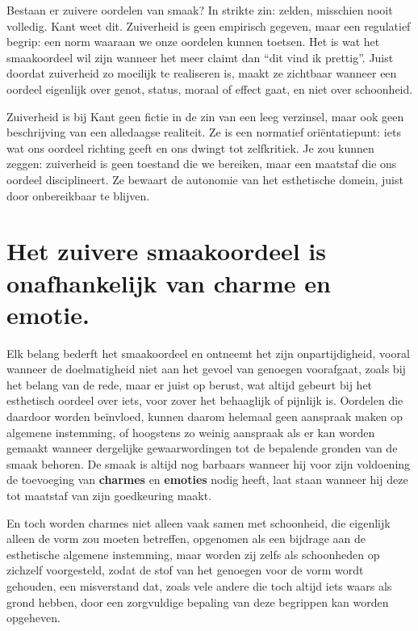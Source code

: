 \begin{mdframed}[leftmargin=0pt,rightmargin=0pt,backgroundcolor=blue!6,linecolor=white,innertopmargin=6pt,innerbottommargin=6pt]
Bestaan er zuivere oordelen van smaak? In strikte zin: zelden, misschien nooit volledig. Kant weet dit. Zuiverheid is geen empirisch gegeven, maar een regulatief begrip: een norm waaraan we onze oordelen kunnen toetsen. Het is wat het smaakoordeel wil zijn wanneer het meer claimt dan “dit vind ik prettig”.
Juist doordat zuiverheid zo moeilijk te realiseren is, maakt ze zichtbaar wanneer een oordeel eigenlijk over genot, status, moraal of effect gaat, en niet over schoonheid.

Zuiverheid is bij Kant geen fictie in de zin van een leeg verzinsel, maar ook geen beschrijving van een alledaagse realiteit. Ze is een normatief oriëntatiepunt: iets wat ons oordeel richting geeft en ons dwingt tot zelfkritiek.
Je zou kunnen zeggen: zuiverheid is geen toestand die we bereiken, maar een maatstaf die ons oordeel disciplineert. Ze bewaart de autonomie van het esthetische domein, juist door onbereikbaar te blijven.
\end{mdframed}

\section{Het zuivere smaakoordeel is onafhankelijk van charme en emotie.}

Elk belang bederft het smaakoordeel en ontneemt het zijn onpartijdigheid, vooral wanneer de doelmatigheid niet aan het gevoel van genoegen voorafgaat, zoals bij het belang van de rede, maar er juist op berust, wat altijd gebeurt bij het esthetisch oordeel over iets, voor zover het behaaglijk of pijnlijk is. Oordelen die daardoor worden beïnvloed, kunnen daarom helemaal geen aanspraak maken op algemene instemming, of hoogstens zo weinig aanspraak als er kan worden gemaakt wanneer dergelijke gewaarwordingen tot de bepalende gronden van de smaak behoren. De smaak is altijd nog barbaars wanneer hij voor zijn voldoening de toevoeging van \textbf{charmes} en \textbf{emoties} nodig heeft, laat staan wanneer hij deze tot maatstaf van zijn goedkeuring maakt.

En toch worden charmes niet alleen vaak samen met schoonheid, die eigenlijk alleen de vorm zou moeten betreffen, opgenomen als een bijdrage aan de esthetische algemene instemming, maar worden zij zelfs als schoonheden op zichzelf voorgesteld, zodat de stof van het genoegen voor de vorm wordt gehouden, een misverstand dat, zoals vele andere die toch altijd iets waars als grond hebben, door een zorgvuldige bepaling van deze begrippen kan worden opgeheven.

